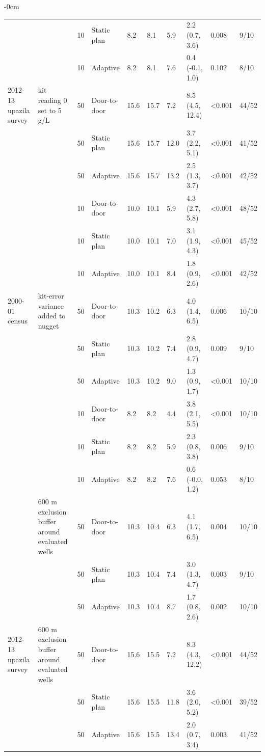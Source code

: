 \documentclass[sustainability,article,submit,pdftex,moreauthors]{Definitions/mdpi}
\begin{document}
\begin{table}[H]
\begin{adjustwidth}{-\extralength}{0cm}
\begin{tabular}{L{2.0cm}L{2.4cm}R{1.2cm}L{1.6cm}R{1.4cm}R{1.2cm}R{1.3cm}L{2.2cm}R{1.0cm}R{0.9cm}}
 &  & 10 & Static plan & 8.2 & 8.1 & 5.9 & 2.2 (0.7, 3.6) & 0.008 & 9/10 \\
 &  & 10 & Adaptive & 8.2 & 8.1 & 7.6 & 0.4 (-0.1, 1.0) & 0.102 & 8/10 \\
2012-13 upazila survey & kit reading 0 set to 5 \textmu{}g/L & 50 & Door-to-door & 15.6 & 15.7 & 7.2 & 8.5 (4.5, 12.4) & <0.001 & 44/52 \\
 &  & 50 & Static plan & 15.6 & 15.7 & 12.0 & 3.7 (2.2, 5.1) & <0.001 & 41/52 \\
 &  & 50 & Adaptive & 15.6 & 15.7 & 13.2 & 2.5 (1.3, 3.7) & <0.001 & 42/52 \\
 &  & 10 & Door-to-door & 10.0 & 10.1 & 5.9 & 4.3 (2.7, 5.8) & <0.001 & 48/52 \\
 &  & 10 & Static plan & 10.0 & 10.1 & 7.0 & 3.1 (1.9, 4.3) & <0.001 & 45/52 \\
 &  & 10 & Adaptive & 10.0 & 10.1 & 8.4 & 1.8 (0.9, 2.6) & <0.001 & 42/52 \\
2000-01 census & kit-error variance added to nugget & 50 & Door-to-door & 10.3 & 10.2 & 6.3 & 4.0 (1.4, 6.5) & 0.006 & 10/10 \\
 &  & 50 & Static plan & 10.3 & 10.2 & 7.4 & 2.8 (0.9, 4.7) & 0.009 & 9/10 \\
 &  & 50 & Adaptive & 10.3 & 10.2 & 9.0 & 1.3 (0.9, 1.7) & <0.001 & 10/10 \\
 &  & 10 & Door-to-door & 8.2 & 8.2 & 4.4 & 3.8 (2.1, 5.5) & <0.001 & 10/10 \\
 &  & 10 & Static plan & 8.2 & 8.2 & 5.9 & 2.3 (0.8, 3.8) & 0.006 & 9/10 \\
 &  & 10 & Adaptive & 8.2 & 8.2 & 7.6 & 0.6 (-0.0, 1.2) & 0.053 & 8/10 \\
 & 600 m exclusion buffer around evaluated wells & 50 & Door-to-door & 10.3 & 10.4 & 6.3 & 4.1 (1.7, 6.5) & 0.004 & 10/10 \\
 &  & 50 & Static plan & 10.3 & 10.4 & 7.4 & 3.0 (1.3, 4.7) & 0.003 & 9/10 \\
 &  & 50 & Adaptive & 10.3 & 10.4 & 8.7 & 1.7 (0.8, 2.6) & 0.002 & 10/10 \\
2012-13 upazila survey & 600 m exclusion buffer around evaluated wells & 50 & Door-to-door & 15.6 & 15.5 & 7.2 & 8.3 (4.3, 12.2) & <0.001 & 44/52 \\
 &  & 50 & Static plan & 15.6 & 15.5 & 11.8 & 3.6 (2.0, 5.2) & <0.001 & 39/52 \\
 &  & 50 & Adaptive & 15.6 & 15.5 & 13.4 & 2.0 (0.7, 3.4) & 0.003 & 41/52 \\
\bottomrule
\end{tabular}
\end{adjustwidth}
\end{table}
\end{document}
